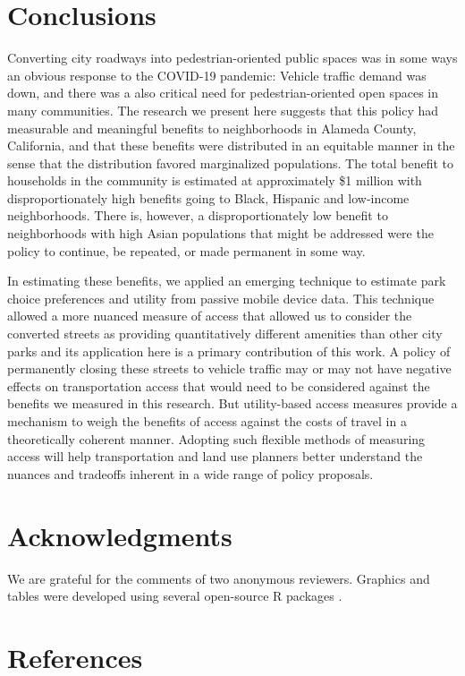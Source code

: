 \documentclass[3p, authoryear, review]{elsarticle} %
\begin{document}
\hypertarget{conclusions}{%
\section{Conclusions}\label{conclusions}}

Converting city roadways into pedestrian-oriented public spaces was in some ways
an obvious response to the COVID-19 pandemic: Vehicle traffic demand was down,
and there was a also critical need for pedestrian-oriented open spaces in many
communities. The research we present here suggests that this policy had
measurable and meaningful benefits to neighborhoods in Alameda County,
California, and that these benefits were distributed in an equitable manner in the sense that the distribution favored marginalized populations. The total benefit to households in the community is estimated
at approximately \$1 million with disproportionately high benefits going to
Black, Hispanic and low-income neighborhoods. There is, however, a
disproportionately low benefit to neighborhoods with high Asian populations that
might be addressed were the policy to continue, be repeated, or made permanent
in some way.

In estimating these benefits, we applied an emerging technique to estimate park
choice preferences and utility from passive mobile device data. This technique
allowed a more nuanced measure of access that allowed us to consider the
converted streets as providing quantitatively different amenities than other city
parks and its application here is a primary contribution of this work.
A policy of permanently closing these streets to vehicle traffic may or
may not have negative effects on transportation access that would need to be
considered against the benefits we measured in this research. But utility-based
access measures provide a mechanism to weigh the benefits of access against the
costs of travel in a theoretically coherent manner. Adopting such flexible
methods of measuring access will help transportation and land use planners
better understand the nuances and tradeoffs inherent in a wide range of policy
proposals.

\hypertarget{acknowledgments}{%
\section*{Acknowledgments}\label{acknowledgments}}

We are grateful for the comments of two anonymous reviewers. Graphics and tables
were developed using several open-source R packages \citep{ggspatial, modelsummary, wesanderson}.

\hypertarget{references}{%
\section*{References}\label{references}}


\end{document}
